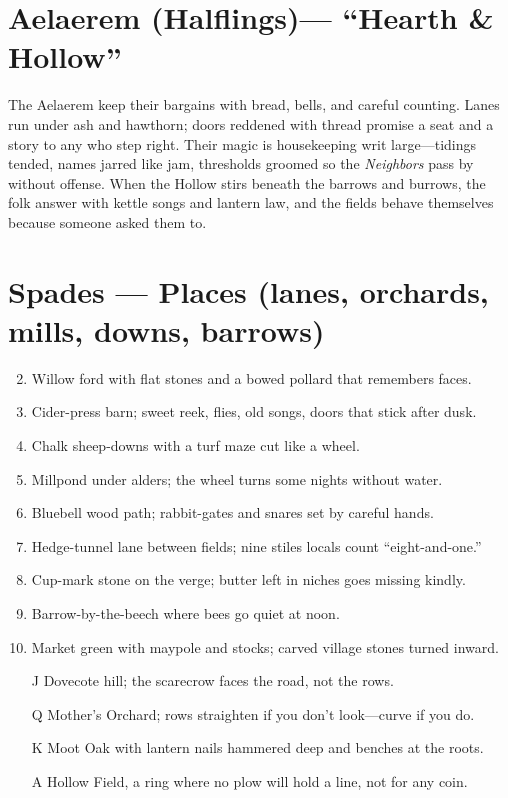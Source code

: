 \section{Aelaerem (Halflings)--- ``Hearth \& Hollow''}
\label{chap:aelaerem}

The Aelaerem keep their bargains with bread, bells, and careful counting. Lanes run under ash and hawthorn; doors reddened with thread promise a seat and a story to any who step right. Their magic is housekeeping writ large---tidings tended, names jarred like jam, thresholds groomed so the \emph{Neighbors} pass by without offense. When the Hollow stirs beneath the barrows and burrows, the folk answer with kettle songs and lantern law, and the fields behave themselves because someone asked them to.

\section*{Spades --- Places (lanes, orchards, mills, downs, barrows)}
\label{sec:aelaerem-places}
\begin{enumerate}
\setcounter{enumi}{1}
\item Willow ford with flat stones and a bowed pollard that remembers faces.
\item Cider-press barn; sweet reek, flies, old songs, doors that stick after dusk.
\item Chalk sheep-downs with a turf maze cut like a wheel.
\item Millpond under alders; the wheel turns some nights without water.
\item Bluebell wood path; rabbit-gates and snares set by careful hands.
\item Hedge-tunnel lane between fields; nine stiles locals count ``eight-and-one.''
\item Cup-mark stone on the verge; butter left in niches goes missing kindly.
\item Barrow-by-the-beech where bees go quiet at noon.
\item Market green with maypole and stocks; carved village stones turned inward.
\item[J] Dovecote hill; the scarecrow faces the road, not the rows.
\item[Q] Mother's Orchard; rows straighten if you don't look---curve if you do.
\item[K] Moot Oak with lantern nails hammered deep and benches at the roots.
\item[A] Hollow Field, a ring where no plow will hold a line, not for any coin.
\end{enumerate}

